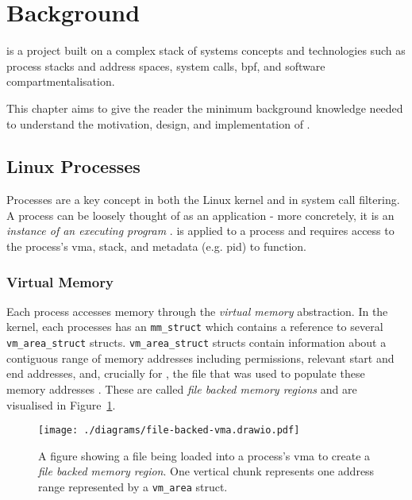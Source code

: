 \section{Background} \label{sec:background}

\af is a project built on a complex stack of systems concepts and technologies
such as process stacks and address spaces, system calls, \ac{bpf}, and software
compartmentalisation. 

This chapter aims to give the reader the minimum background knowledge needed
to understand the motivation, design, and implementation of \af. 

\subsection{Linux Processes}

Processes are a key concept in both the Linux kernel and in system call
filtering. A process can be loosely thought of as an application - more 
concretely, it is an \textit{instance of an executing program} 
\cite{LINUX_PROGRAMMING_INTERFACE}. \af is applied to a process and requires 
access to the process's \ac{vma}, stack, and metadata (e.g. \ac{pid}) to 
function.

\subsubsection{Virtual Memory}

Each process accesses memory through the \textit{virtual memory} abstraction.
In the kernel, each processes has an \texttt{mm\_struct} which contains a
reference to several \texttt{vm\_area\_struct} structs. 
\texttt{vm\_area\_struct} structs contain information about a contiguous
range of memory addresses including permissions, relevant start and end
addresses, and, crucially for \af, the file that was used to populate these
memory addresses \cite{love2005linux}. These are called \textit{file backed
memory regions} and are visualised in Figure~\ref{fig:file-backed-vma}.

\begin{figure}[ht]
    \centering
    \texttt{[image: ./diagrams/file-backed-vma.drawio.pdf]} 
    \caption{A figure showing a file being loaded into a process's \ac{vma} to
    create a \textit{file backed memory region}. One vertical chunk represents
one address range represented by a \texttt{vm\_area} struct.}
    \label{fig:file-backed-vma}
\end{figure}


